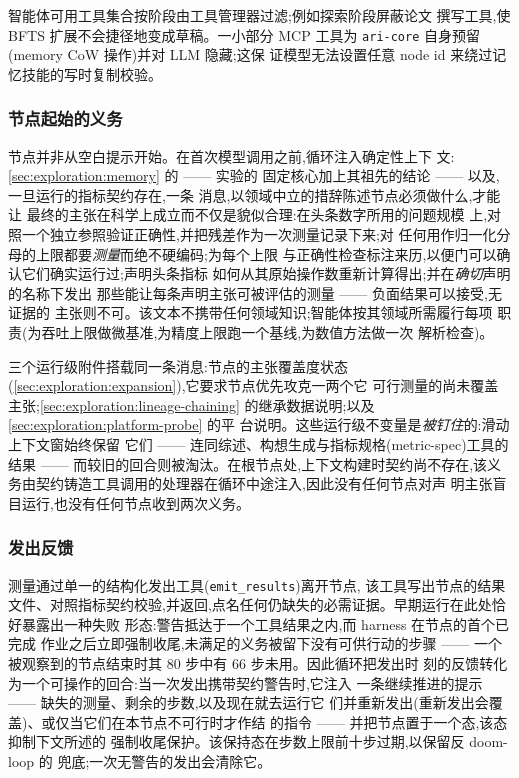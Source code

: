智能体可用工具集合按阶段由工具管理器过滤;例如探索阶段屏蔽论文
撰写工具,使 BFTS 扩展不会捷径地变成草稿。一小部分 MCP 工具为
\texttt{ari-core} 自身预留(memory CoW 操作)并对 LLM 隐藏;这保
证模型无法设置任意 node id 来绕过记忆技能的写时复制校验。

\subsubsection*{节点起始的义务}

节点并非从空白提示开始。在首次模型调用之前,循环注入确定性上下
文:\cref{sec:exploration:memory} 的 —— 实验的
固定核心加上其祖先的结论 —— 以及,一旦运行的指标契约存在,一条
消息,以领域中立的措辞陈述节点必须做什么,才能让
最终的主张在科学上成立而不仅是貌似合理:在头条数字所用的问题规模
上,对照一个独立参照验证正确性,并把残差作为一次测量记录下来;对
任何用作归一化分母的上限都要\emph{测量}而绝不硬编码;为每个上限
与正确性检查标注来历,以便门可以确认它们确实运行过;声明头条指标
如何从其原始操作数重新计算得出;并在\emph{确切}声明的名称下发出
那些能让每条声明主张可被评估的测量 —— 负面结果可以接受,无证据的
主张则不可。该文本不携带任何领域知识;智能体按其领域所需履行每项
职责(为吞吐上限做微基准,为精度上限跑一个基线,为数值方法做一次
解析检查)。

三个运行级附件搭载同一条消息:节点的主张覆盖度状态
(\cref{sec:exploration:expansion}),它要求节点优先攻克一两个它
可行测量的尚未覆盖主张;\cref{sec:exploration:lineage-chaining}
的继承数据说明;以及 \cref{sec:exploration:platform-probe} 的平
台说明。这些运行级不变量是\emph{被钉住}的:滑动上下文窗始终保留
它们 —— 连同综述、构想生成与指标规格(metric-spec)工具的结果 ——
而较旧的回合则被淘汰。在根节点处,上下文构建时契约尚不存在,该义
务由契约铸造工具调用的处理器在循环中途注入,因此没有任何节点对声
明主张盲目运行,也没有任何节点收到两次义务。

\subsubsection*{发出反馈}

测量通过单一的结构化发出工具(\texttt{emit\_results})离开节点,
该工具写出节点的结果文件、对照指标契约校验,并返回,点名任何仍缺失的必需证据。早期运行在此处恰好暴露出一种失败
形态:警告抵达于一个工具结果之内,而 harness 在节点的首个已完成
作业之后立即强制收尾,未满足的义务被留下没有可供行动的步骤 ——
一个被观察到的节点结束时其 80 步中有 66 步未用。因此循环把发出时
刻的反馈转化为一个可操作的回合:当一次发出携带契约警告时,它注入
一条继续推进的提示 —— 缺失的测量、剩余的步数,以及现在就去运行它
们并重新发出(重新发出会覆盖)、或仅当它们在本节点不可行时才作结
的指令 —— 并把节点置于一个态,该态抑制下文所述的
强制收尾保护。该保持态在步数上限前十步过期,以保留反 doom-loop 的
兜底;一次无警告的发出会清除它。

